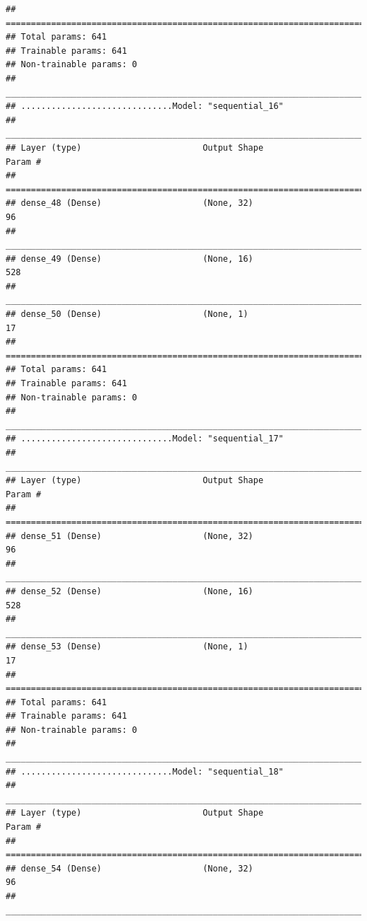 \documentclass[
]{article}
\begin{document}
\begin{verbatim}
## ================================================================================
## Total params: 641
## Trainable params: 641
## Non-trainable params: 0
## ________________________________________________________________________________
## ..............................Model: "sequential_16"
## ________________________________________________________________________________
## Layer (type)                        Output Shape                    Param #     
## ================================================================================
## dense_48 (Dense)                    (None, 32)                      96          
## ________________________________________________________________________________
## dense_49 (Dense)                    (None, 16)                      528         
## ________________________________________________________________________________
## dense_50 (Dense)                    (None, 1)                       17          
## ================================================================================
## Total params: 641
## Trainable params: 641
## Non-trainable params: 0
## ________________________________________________________________________________
## ..............................Model: "sequential_17"
## ________________________________________________________________________________
## Layer (type)                        Output Shape                    Param #     
## ================================================================================
## dense_51 (Dense)                    (None, 32)                      96          
## ________________________________________________________________________________
## dense_52 (Dense)                    (None, 16)                      528         
## ________________________________________________________________________________
## dense_53 (Dense)                    (None, 1)                       17          
## ================================================================================
## Total params: 641
## Trainable params: 641
## Non-trainable params: 0
## ________________________________________________________________________________
## ..............................Model: "sequential_18"
## ________________________________________________________________________________
## Layer (type)                        Output Shape                    Param #     
## ================================================================================
## dense_54 (Dense)                    (None, 32)                      96          
## ________________________________________________________________________________

\end{verbatim}
\end{document}

